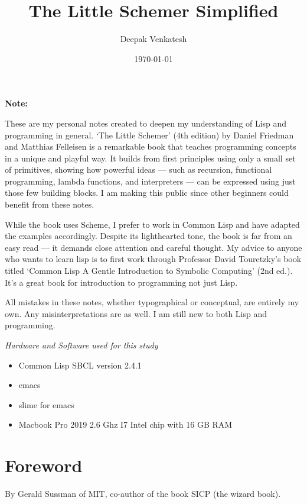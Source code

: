 \documentclass[11pt]{article}
\author{Deepak Venkatesh}
\date{\today}
\title{The Little Schemer Simplified}
\begin{document}
\maketitle
\tableofcontents

\newpage
\textbf{Note:}

\vspace{1em}

These are my personal notes created to deepen my understanding of Lisp and programming in general. `The Little Schemer'
(4th edition) by Daniel Friedman and Matthias Felleisen is a remarkable book that teaches programming concepts in a
unique and playful way. It builds from first principles using only a small set of primitives, showing how powerful
ideas — such as recursion, functional programming, lambda functions, and interpreters — can be expressed using just
those few building blocks. I am making this public since other beginners could benefit from these notes.

While the book uses Scheme, I prefer to work in Common Lisp and have adapted the examples accordingly. Despite its
lighthearted tone, the book is far from an easy read — it demands close attention and careful thought. My advice to
anyone who wants to learn lisp is to first work through Professor David Touretzky's book titled `Common Lisp A Gentle
Introduction to Symbolic Computing' (2nd ed.). It's a great book for introduction to programming not just Lisp.

All mistakes in these notes, whether typographical or conceptual, are entirely my own. Any misinterpretations are as
well. I am still new to both Lisp and programming.

\vspace{1em}

\emph{Hardware and Software used for this study}
\begin{itemize}
\item Common Lisp SBCL version 2.4.1
\item emacs
\item slime for emacs
\item Macbook Pro 2019 2.6 Ghz I7 Intel chip with 16 GB RAM
\end{itemize}

\newpage
\section{Foreword}
\label{sec:org3c39b7b}

By Gerald Sussman of MIT, co-author of the book SICP (the wizard book).
\end{document}
